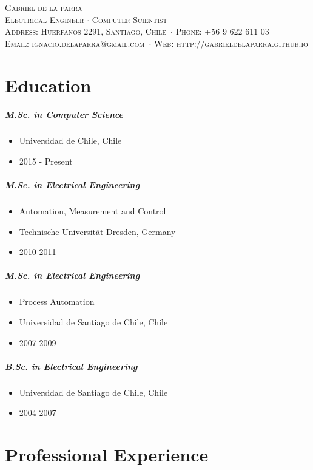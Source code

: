 \documentclass[10pt,letterpaper]{article}
\newcommand{\namestyle}{\Huge \scshape}
\newcommand{\deptstyle}{\footnotesize \rmfamily \scshape}
\newcommand{\addressstyle}{\color{addresscolor} \footnotesize \rmfamily \upshape}
\begin{document}
	\begin{flushright}
	\namestyle Gabriel de la parra \\[0.3em]
	\deptstyle Electrical Engineer $\cdot$ Computer Scientist \\[0.2em]
	\addressstyle Address: Huerfanos 2291, Santiago, Chile\ $\cdot$ Phone: +56 9 622 611 03\\
	Email: ignacio.delaparra@gmail.com\ $\cdot$ Web: http://gabrieldelaparra.github.io
	\end{flushright}
	
	\small
	
	\section*{Education}
	
	\subparagraph{M.Sc. in Computer Science}
		\begin{itemize}
			\item Universidad de Chile, Chile 
			\item 2015 - Present
		\end{itemize}
	
	\subparagraph{M.Sc. in Electrical Engineering}
		\begin{itemize}
			\item Automation, Measurement and Control
			\item Technische Universit\"{a}t Dresden, Germany
			\item 2010-2011
		\end{itemize}

	\subparagraph{M.Sc. in Electrical Engineering}
		\begin{itemize}
			\item Process Automation
			\item Universidad de Santiago de Chile, Chile
			\item 2007-2009
		\end{itemize}

	\subparagraph{B.Sc. in Electrical Engineering}
		\begin{itemize}
			\item Universidad de Santiago de Chile, Chile
			\item 2004-2007
		\end{itemize}


	\section*{Professional Experience}	
	
\end{document}
